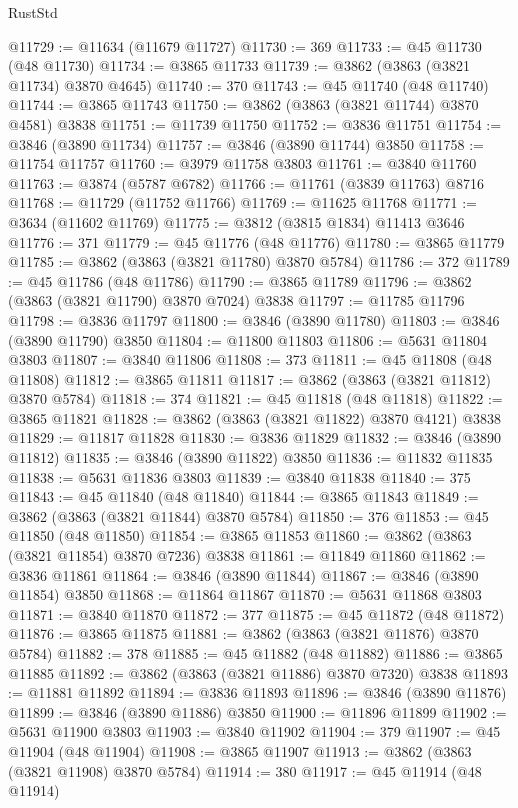 \begin{lexlean}{RustStd}
\begin{coremodule}
@11729 := @11634 (@11679 @11727)
@11730 := 369
@11733 := @45 @11730 (@48 @11730)
@11734 := @3865 @11733
@11739 := @3862 (@3863 (@3821 @11734) @3870 @4645)
@11740 := 370
@11743 := @45 @11740 (@48 @11740)
@11744 := @3865 @11743
@11750 := @3862 (@3863 (@3821 @11744) @3870 @4581) @3838
@11751 := @11739 @11750
@11752 := @3836 @11751
@11754 := @3846 (@3890 @11734)
@11757 := @3846 (@3890 @11744) @3850
@11758 := @11754 @11757
@11760 := @3979 @11758 @3803
@11761 := @3840 @11760
@11763 := @3874 (@5787 @6782)
@11766 := @11761 (@3839 @11763) @8716
@11768 := @11729 (@11752 @11766)
@11769 := @11625 @11768
@11771 := @3634 (@11602 @11769)
@11775 := @3812 (@3815 @1834) @11413 @3646
@11776 := 371
@11779 := @45 @11776 (@48 @11776)
@11780 := @3865 @11779
@11785 := @3862 (@3863 (@3821 @11780) @3870 @5784)
@11786 := 372
@11789 := @45 @11786 (@48 @11786)
@11790 := @3865 @11789
@11796 := @3862 (@3863 (@3821 @11790) @3870 @7024) @3838
@11797 := @11785 @11796
@11798 := @3836 @11797
@11800 := @3846 (@3890 @11780)
@11803 := @3846 (@3890 @11790) @3850
@11804 := @11800 @11803
@11806 := @5631 @11804 @3803
@11807 := @3840 @11806
@11808 := 373
@11811 := @45 @11808 (@48 @11808)
@11812 := @3865 @11811
@11817 := @3862 (@3863 (@3821 @11812) @3870 @5784)
@11818 := 374
@11821 := @45 @11818 (@48 @11818)
@11822 := @3865 @11821
@11828 := @3862 (@3863 (@3821 @11822) @3870 @4121) @3838
@11829 := @11817 @11828
@11830 := @3836 @11829
@11832 := @3846 (@3890 @11812)
@11835 := @3846 (@3890 @11822) @3850
@11836 := @11832 @11835
@11838 := @5631 @11836 @3803
@11839 := @3840 @11838
@11840 := 375
@11843 := @45 @11840 (@48 @11840)
@11844 := @3865 @11843
@11849 := @3862 (@3863 (@3821 @11844) @3870 @5784)
@11850 := 376
@11853 := @45 @11850 (@48 @11850)
@11854 := @3865 @11853
@11860 := @3862 (@3863 (@3821 @11854) @3870 @7236) @3838
@11861 := @11849 @11860
@11862 := @3836 @11861
@11864 := @3846 (@3890 @11844)
@11867 := @3846 (@3890 @11854) @3850
@11868 := @11864 @11867
@11870 := @5631 @11868 @3803
@11871 := @3840 @11870
@11872 := 377
@11875 := @45 @11872 (@48 @11872)
@11876 := @3865 @11875
@11881 := @3862 (@3863 (@3821 @11876) @3870 @5784)
@11882 := 378
@11885 := @45 @11882 (@48 @11882)
@11886 := @3865 @11885
@11892 := @3862 (@3863 (@3821 @11886) @3870 @7320) @3838
@11893 := @11881 @11892
@11894 := @3836 @11893
@11896 := @3846 (@3890 @11876)
@11899 := @3846 (@3890 @11886) @3850
@11900 := @11896 @11899
@11902 := @5631 @11900 @3803
@11903 := @3840 @11902
@11904 := 379
@11907 := @45 @11904 (@48 @11904)
@11908 := @3865 @11907
@11913 := @3862 (@3863 (@3821 @11908) @3870 @5784)
@11914 := 380
@11917 := @45 @11914 (@48 @11914)

\end{coremodule}
\end{lexlean}
